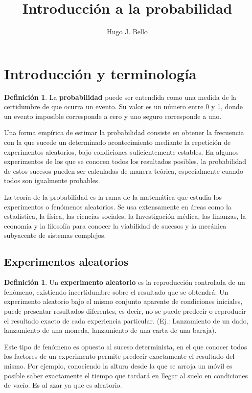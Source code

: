 \documentclass[]{article}
\title{Introducción a la probabilidad}
\author{Hugo J. Bello}
\date{}
\theoremstyle{plain}
\theoremstyle{definition}
\newtheorem{definition}[theorem]{Definición}
\begin{document}
\section{Introducción y terminología}

\begin{definition}
La \textbf{probabilidad} puede ser entendida como una medida de la certidumbre de que ocurra un evento. 
Su valor es un número entre 0 y 1, 
donde un evento imposible corresponde a cero y uno seguro corresponde a uno.
\end{definition}

Una forma empírica de estimar la probabilidad consiste en obtener la 
frecuencia con la que sucede un determinado acontecimiento mediante la 
repetición de experimentos aleatorios, bajo condiciones suficientemente estables. 
En algunos experimentos de los que se conocen todos los resultados posibles, 
la probabilidad de estos sucesos pueden ser calculadas de manera teórica, 
especialmente cuando todos son igualmente probables.

La teoría de la probabilidad es la rama de la matemática que estudia los experimentos 
o fenómenos aleatorios. Se usa extensamente en áreas como la estadística, 
la física, las ciencias sociales, la Investigación médica, las finanzas, 
la economía y la filosofía para conocer la viabilidad de sucesos 
y la mecánica subyacente de sistemas complejos. 

\subsection*{Experimentos aleatorios}

\begin{definition}
Un \textbf{experimento aleatorio} es la reproducción controlada de un fenómeno, 
existiendo incertidumbre sobre el resultado que se obtendrá.
Un experimento aleatorio bajo el mismo conjunto aparente de condiciones iniciales, 
puede presentar resultados diferentes, es decir, no se puede predecir o reproducir 
el resultado exacto de cada experiencia particular. (Ej.: Lanzamiento de un dado,
lanzamiento de una moneda, lanzamiento de una carta de una baraja).

Este tipo de fenómeno es opuesto al suceso determinista, 
en el que conocer todos los factores de un experimento permite 
predecir exactamente el resultado del mismo. Por ejemplo, conociendo 
la altura desde la que se arroja un móvil es posible saber exactamente
el tiempo que tardará en llegar al suelo en condiciones de vacío. 
 Es al azar ya que es aleatorio. 
\end{definition}
\end{document}
